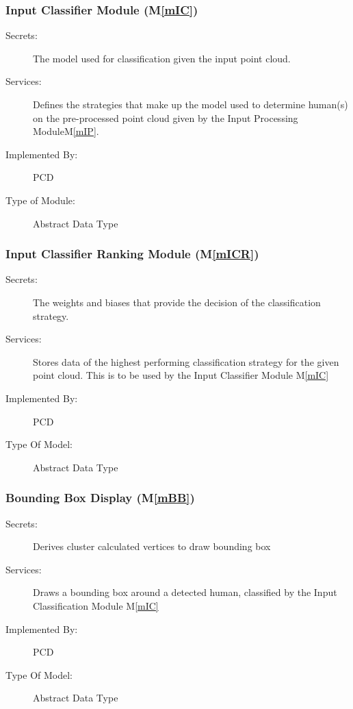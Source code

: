 \documentclass[12pt, titlepage]{article}
\newcommand{\mref}[1]{M\ref{#1}}
\begin{document}
\subsubsection{Input Classifier Module (\mref{mIC})}

\begin{description}
\item[Secrets:]The model used for classification given the input point cloud.
\item[Services:]Defines the strategies that make up the model used to determine human(s) on the pre-processed point 
  cloud given by the Input Processing Module\mref{mIP}.
\item[Implemented By:]PCD
\item[Type of Module:]Abstract Data Type
\end{description}

\subsubsection{Input Classifier Ranking Module (\mref{mICR})}

\begin{description}
\item[Secrets:]The weights and biases that provide the decision of the classification strategy.
\item[Services:]Stores data of the highest performing classification strategy for the given point cloud.
  This is to be used by the Input Classifier Module \mref{mIC}
\item[Implemented By:]PCD
\item[Type Of Model:]Abstract Data Type
\end{description}

\subsubsection{Bounding Box Display (\mref{mBB})}

\begin{description}
\item[Secrets:]Derives cluster calculated vertices to draw bounding box
\item[Services:]Draws a bounding box around a detected human, classified by the Input Classification Module \mref{mIC}
\item[Implemented By:]PCD
\item[Type Of Model:]Abstract Data Type
\end{description}
\end{document}
